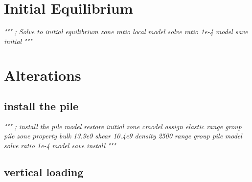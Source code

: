 \documentclass[a4paper, nobind]{templates/ociamthesis}
\newenvironment{Shaded}{\begin{snugshade}}{\end{snugshade}}
\newcommand{\CommentTok}[1]{\textcolor[rgb]{0.56,0.35,0.01}{\textit{#1}}}
\renewenvironment{Shaded}
{
  \vspace{10pt}%
  \begin{snugshade}%
}{%
  \end{snugshade}%
  \vspace{8pt}%
}
\begin{document}
\hypertarget{initial-equilibrium-1}{%
\section{Initial Equilibrium}\label{initial-equilibrium-1}}

\begin{Shaded}
\begin{Highlighting}[]
\CommentTok{"""}
\CommentTok{; Solve to initial equilibrium}
\CommentTok{zone ratio local}
\CommentTok{model solve ratio 1e{-}4}
\CommentTok{model save \textquotesingle{}initial\textquotesingle{}}
\CommentTok{"""}
\end{Highlighting}
\end{Shaded}

\hypertarget{alterations-1}{%
\section{Alterations}\label{alterations-1}}

\hypertarget{install-the-pile}{%
\subsection{install the pile}\label{install-the-pile}}

\begin{Shaded}
\begin{Highlighting}[]
\CommentTok{"""}
\CommentTok{; install the pile}
\CommentTok{model restore \textquotesingle{}initial\textquotesingle{}}
\CommentTok{zone cmodel assign elastic                          range group \textquotesingle{}pile\textquotesingle{}}
\CommentTok{zone property bulk 13.9e9 shear 10.4e9 density 2500 range group \textquotesingle{}pile\textquotesingle{}}
\CommentTok{model solve ratio 1e{-}4}
\CommentTok{model save \textquotesingle{}install\textquotesingle{}}
\CommentTok{"""}
\end{Highlighting}
\end{Shaded}

\hypertarget{vertical-loading}{%
\subsection{vertical loading}\label{vertical-loading}}
\end{document}
